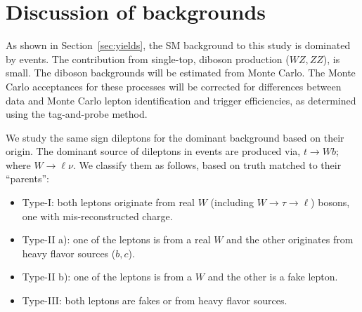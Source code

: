 \section{Discussion of backgrounds}
\label{sec:bkgtypes}

As shown in Section~\ref{sec:yields}, the SM background to this study is dominated 
by \ttbar events. The contribution from single-top, diboson production ($WZ, ZZ$), 
is small. The diboson backgrounds will be estimated from Monte Carlo. 
The Monte Carlo acceptances for these processes will be corrected for differences between 
data and Monte Carlo lepton identification and trigger efficiencies, as determined using 
the tag-and-probe method.

We study the same sign dileptons for the dominant \ttbar background based on their origin.
The dominant source of dileptons in \ttbar events are produced via, $t \rightarrow W b$; where 
$W \rightarrow \ell \nu $. We classify them as follows, based on truth matched to their ``parents'':

\begin{itemize}
\item Type-I: both leptons originate from real $W$ (including $W \rightarrow \tau \rightarrow \ell$) bosons, one with mis-reconstructed charge.
\item Type-II a): one of the leptons is from a real $W$ and the other originates from heavy flavor sources ($b, c$).
\item Type-II b): one of the leptons is from a $W$ and the other is a fake lepton.
\item Type-III: both leptons are fakes or from heavy flavor sources.
\end{itemize} 

